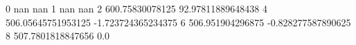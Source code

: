 0 nan nan
1 nan nan
2 600.75830078125 92.97811889648438
4 506.05645751953125 -1.723724365234375
6 506.951904296875 -0.828277587890625
8 507.7801818847656 0.0
